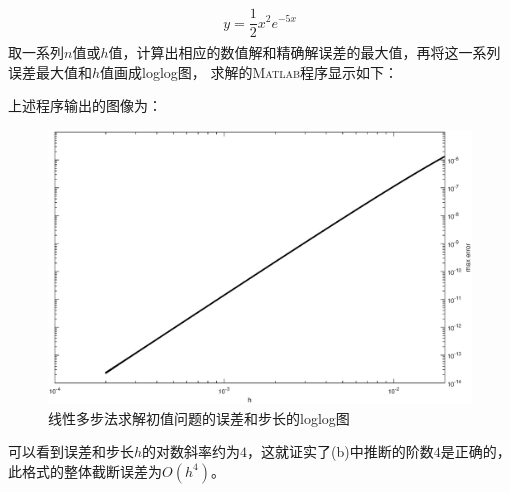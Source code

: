 \documentclass[12pt,a4paper,utf8]{ctexart}
\begin{document}
\begin{enumerate}
   \begin{eqnarray}
      \begin{aligned}
         y=\dfrac{1}{2}x^2e^{-5x}
      \end{aligned}
   \end{eqnarray}
   取一系列$n$值或$h$值，计算出相应的数值解和精确解误差的最大值，再将这一系列误差最大值和$h$值画成loglog图，
   求解的\textsc{Matlab}程序显示如下：
   
   上述程序输出的图像为：
   \begin{figure}[H]
      \centering
      \includegraphics[width=1\textwidth]{fig/p3d.eps}
      \caption{线性多步法求解初值问题的误差和步长的loglog图}
   \end{figure}
   可以看到误差和步长$h$的对数斜率约为$4$，这就证实了(b)中推断的阶数$4$是正确的，此格式的整体截断误差为$O(h^4)$。
\end{enumerate}
\end{document}
